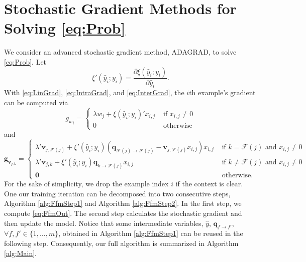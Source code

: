 \documentclass[11pt]{article}
\newcommand{\bsym}[1]{\ensuremath{\boldsymbol{#1}}}
\newcommand{\bg}{\ensuremath{\bsym{g}}}
\newcommand{\bv}{\ensuremath{\bsym{v}}}
\newcommand{\bq}{\ensuremath{\bsym{q}}}
\newcommand{\field}{\ensuremath{\mathcal F}}
\begin{document}
\section{Stochastic Gradient Methods for Solving \eqref{eq:Prob}}
We consider an advanced stochastic gradient method, ADAGRAD, to solve \eqref{eq:Prob}.
Let
\begin{equation*}
    \xi'(\hat{y}_i; y_i) = \frac{\partial \xi(\hat{y}_i; y_i)}{\partial \hat{y}_i}.
\end{equation*}
With \eqref{eq:LinGrad}, \eqref{eq:IntraGrad}, and \eqref{eq:InterGrad}, the $i$th example's gradient can be computed via
\begin{equation}
    g_{w_j} = 
    \begin{cases}
        \lambda w_j + \xi(\hat{y}_i; y_i)' x_{i,j} &\text{ if } x_{i,j} \ne 0\\
        0 &\text{ otherwise}
    \end{cases}
    \label{eq:GradW}
\end{equation}
and
\begin{equation}
    \bg_{\bv_{j, k}} = 
    \begin{cases}
        \lambda' \bv_{j,\field(j)} + \xi'(\hat{y}_i; y_i) (\bq_{\field(j) \rightarrow \field(j)} - \bv_{j, \field(j)}x_{i,j}) x_{i,j} & \text{ if } k=\field(j) \text{ and } x_{i,j}\ne 0\\
        \lambda' \bv_{j,k} + \xi'(\hat{y}_i; y_i) \bq_{k\rightarrow \field(j)} x_{i,j} & \text{ if } k\ne \field(j) \text{ and } x_{i,j}\ne 0\\
        \bsym{0} & \text{ otherwise}.
    \end{cases}
    \label{eq:GradV}
\end{equation}
For the sake of simplicity, we drop the example index $i$ if the context is clear.
One our training iteration can be decomposed into two consecutive steps, Algorithm \ref{alg:FfmStep1} and Algorithm \ref{alg:FfmStep2}.
In the first step, we compute \eqref{eq:FfmOut}.
The second step calculates the stochastic gradient and then update the model.
Notice that some intermediate variables, $\hat{y}$, $\bq_{f\rightarrow f'}$, $\forall f,f'\in\{1,\dots,m\}$, obtained in Algorithm \ref{alg:FfmStep1} can be reused in the following step.
Consequently, our full algorithm is summarized in Algorithm \ref{alg:Main}.
\end{document}

